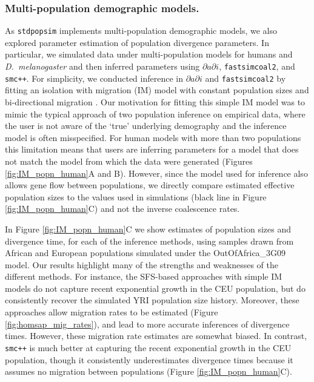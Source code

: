 \documentclass[12pt,halfline,a4paper]{ouparticle}
\newcommand{\stdpopsim}{\texttt{stdpopsim}\xspace}
\newcommand{\dadi}{$\partial a \partial i$\xspace}
\newcommand{\smcpp}{\texttt{smc++}\xspace}
\newcommand{\fastsimcoal}{\texttt{fastsimcoal2}\xspace}
\begin{document}
\subsubsection*{Multi-population demographic models.}
As \stdpopsim implements multi-population demographic models, we also
explored parameter estimation of population divergence parameters. In particular,
we simulated data under multi-population models for humans and \textit{D.~melanogaster}
and then inferred  parameters using \dadi, \fastsimcoal, and \smcpp.
For simplicity, we conducted inference in \dadi and \fastsimcoal by fitting an isolation with migration (IM) model
with constant population sizes and bi-directional migration \citep{hey2004im}.
Our motivation for fitting this simple
IM model was to mimic the typical approach of two population inference on empirical
data, where the user is not aware of the `true' underlying demography and the inference
model is often misspecified.
For human models with more than two populations \citep[e.g.,][]{gutenkunst2009inferring}
this limitation means that users are inferring parameters for a model that does
not match the model from which the data were generated (Figures
\ref{fig:IM_popn_human}A and B). However, since the model used for inference also
allows gene flow between populations, we directly compare estimated effective population sizes
to the values used in simulations (black line in Figure \ref{fig:IM_popn_human}C)
and not the inverse coalescence rates.

In Figure \ref{fig:IM_popn_human}C we show estimates of population sizes and divergence
time, for each of the inference methods, using samples drawn from African and European populations
simulated under the OutOfAfrica\_3G09 model. Our results highlight many
of the strengths and weaknesses of the different methods.
For instance, the SFS-based approaches with simple IM models do not capture
recent exponential growth in the CEU population, but do consistently recover the
simulated YRI population size history. Moreover, these approaches allow
migration rates to be estimated (Figure \ref{fig:homsap_mig_rates}), and lead to more accurate inferences
of divergence times. However, these migration rate estimates are somewhat biased.
In contrast, \smcpp is much better at capturing the recent exponential
growth in the CEU population, though it consistently underestimates divergence times
because it assumes no migration between populations (Figure \ref{fig:IM_popn_human}C).
\end{document}
